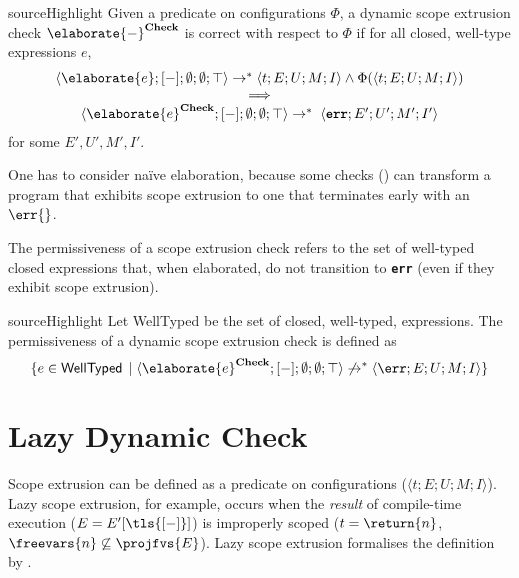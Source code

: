 \begin{definition}{sourceHighlight}
 Given a predicate on configurations $\Phi$, a dynamic scope extrusion check $\elaborate{-}^{\textbf{Check}}$ is correct with respect to $\Phi$ if for all closed, well-type \sourceLang{} expressions $e$,
 \[\begin{array}{c} \langle \elaborate{e} ; [-]; \emptyset;\emptyset; \top \rangle \to^{*} \langle t;E;U;M;I \rangle \land \Phi(\langle t;E;U;M;I \rangle)
\\ \implies \\
\langle \elaborate{e}^{\textbf{Check}} ; [-]; \emptyset;\emptyset; \top \rangle  \to^{*} \; \langle \textbf{\texttt{err}};E';U';M';I' \rangle
 \end{array}
 \]
 for some $E', U', M', I'$. 
\end{definition}

One has to consider naïve elaboration, because some checks () can transform a program that exhibits scope extrusion to one that terminates early with an $\err{}$.

The permissiveness of a scope extrusion check refers to the set of well-typed closed \sourceLang{} expressions that, when elaborated, do not transition to \textbf{\texttt{err}} (even if they exhibit scope extrusion).

\begin{definition}{sourceHighlight}
 Let \textsf{WellTyped} be the set of closed, well-typed, \sourceLang{} expressions.
 The permissiveness of a dynamic scope extrusion check is defined as 
 \[\{ e \in \textsf{WellTyped}\, \mid \langle \elaborate{e}^{\textbf{Check}};[-];\emptyset;\emptyset;\top \rangle \not\to^{*} \langle \err ; E ; U ; M ; I \rangle \} \]
\end{definition}

\section{Lazy Dynamic Check}\label{section:lazy-dynamic-check-formal}
Scope extrusion can be defined as a predicate on \coreLang{} configurations ($\langle t;E;U;M;I\rangle$). Lazy scope extrusion, for example, occurs when the \textit{result} of compile-time execution ($E = E'[\tls{[-]}]$) is improperly scoped ($t = \return{n}$, $\freevars{n} \not\subseteq \projfvs{E}$). Lazy scope extrusion formalises the definition by \citet{kiselyov-14}.

